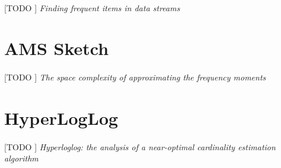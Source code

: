 \documentclass{subfiles}
\begin{document}
      \paragraph{}
      [TODO ] \emph{Finding frequent items in data streams} \cite{charikar2002finding}

    \section{AMS Sketch}
    \label{sec:ams_sketch}

      \paragraph{}
      [TODO ] \emph{The space complexity of approximating the frequency moments} \cite{alon1996space}

    \section{HyperLogLog}
    \label{sec:hyper_log_log}

      \paragraph{}
      [TODO ] \emph{Hyperloglog: the analysis of a near-optimal cardinality estimation algorithm} \cite{flajolet2007hyperloglog}
\end{document}
